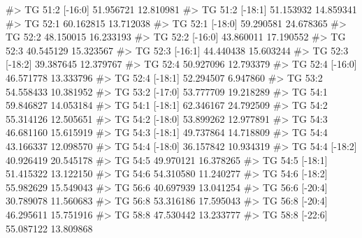 \documentclass[
  letterpaper,
  DIV=11,
  numbers=noendperiod]{scrreprt}
\newenvironment{Shaded}{\begin{snugshade}}{\end{snugshade}}
\newcommand{\CommentTok}[1]{\textcolor[rgb]{0.37,0.37,0.37}{#1}}
\begin{document}
\begin{Shaded}
\begin{Highlighting}[]
\CommentTok{\#\textgreater{} TG 51:2 [{-}16:0]                           51.956721 12.810981}
\CommentTok{\#\textgreater{} TG 51:2 [{-}18:1]                           51.153932 14.859341}
\CommentTok{\#\textgreater{} TG 52:1                                   60.162815 13.712038}
\CommentTok{\#\textgreater{} TG 52:1 [{-}18:0]                           59.290581 24.678365}
\CommentTok{\#\textgreater{} TG 52:2                                   48.150015 16.233193}
\CommentTok{\#\textgreater{} TG 52:2 [{-}16:0]                           43.860011 17.190552}
\CommentTok{\#\textgreater{} TG 52:3                                   40.545129 15.323567}
\CommentTok{\#\textgreater{} TG 52:3 [{-}16:1]                           44.440438 15.603244}
\CommentTok{\#\textgreater{} TG 52:3 [{-}18:2]                           39.387645 12.379767}
\CommentTok{\#\textgreater{} TG 52:4                                   50.927096 12.793379}
\CommentTok{\#\textgreater{} TG 52:4 [{-}16:0]                           46.571778 13.333796}
\CommentTok{\#\textgreater{} TG 52:4 [{-}18:1]                           52.294507  6.947860}
\CommentTok{\#\textgreater{} TG 53:2                                   54.558433 10.381952}
\CommentTok{\#\textgreater{} TG 53:2 [{-}17:0]                           53.777709 19.218289}
\CommentTok{\#\textgreater{} TG 54:1                                   59.846827 14.053184}
\CommentTok{\#\textgreater{} TG 54:1 [{-}18:1]                           62.346167 24.792509}
\CommentTok{\#\textgreater{} TG 54:2                                   55.314126 12.505651}
\CommentTok{\#\textgreater{} TG 54:2 [{-}18:0]                           53.899262 12.977891}
\CommentTok{\#\textgreater{} TG 54:3                                   46.681160 15.615919}
\CommentTok{\#\textgreater{} TG 54:3 [{-}18:1]                           49.737864 14.718809}
\CommentTok{\#\textgreater{} TG 54:4                                   43.166337 12.098570}
\CommentTok{\#\textgreater{} TG 54:4 [{-}18:0]                           36.157842 10.934319}
\CommentTok{\#\textgreater{} TG 54:4 [{-}18:2]                           40.926419 20.545178}
\CommentTok{\#\textgreater{} TG 54:5                                   49.970121 16.378265}
\CommentTok{\#\textgreater{} TG 54:5 [{-}18:1]                           51.415322 13.122150}
\CommentTok{\#\textgreater{} TG 54:6                                   54.310580 11.240277}
\CommentTok{\#\textgreater{} TG 54:6 [{-}18:2]                           55.982629 15.549043}
\CommentTok{\#\textgreater{} TG 56:6                                   40.697939 13.041254}
\CommentTok{\#\textgreater{} TG 56:6 [{-}20:4]                           30.789078 11.560683}
\CommentTok{\#\textgreater{} TG 56:8                                   53.316186 17.595043}
\CommentTok{\#\textgreater{} TG 56:8 [{-}20:4]                           46.295611 15.751916}
\CommentTok{\#\textgreater{} TG 58:8                                   47.530442 13.233777}
\CommentTok{\#\textgreater{} TG 58:8 [{-}22:6]                           55.087122 13.809868}


\end{Highlighting}
\end{Shaded}
\end{document}
